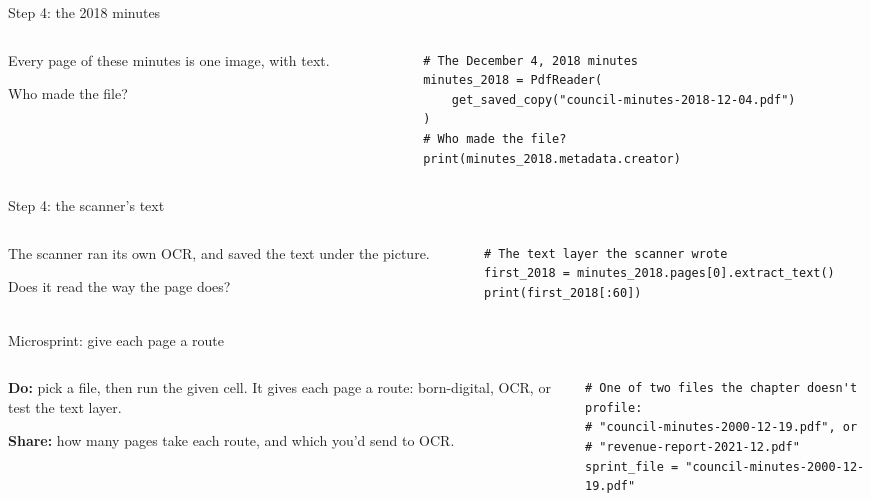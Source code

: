 \documentclass[9pt,aspectratio=169]{beamer}
\begin{document}
\begin{frame}[fragile]{Step 4: the 2018 minutes}
    \begin{columns}[T]
        \begin{column}{0.37\textwidth}
            Every page of these minutes is one image, with text.

            \medskip
            Who made the file?
        \end{column}
        \begin{column}{0.6\textwidth}
\begin{lstlisting}
# The December 4, 2018 minutes
minutes_2018 = PdfReader(
    get_saved_copy("council-minutes-2018-12-04.pdf")
)
# Who made the file?
print(minutes_2018.metadata.creator)
\end{lstlisting}
        \end{column}
    \end{columns}
\end{frame}

\begin{frame}[fragile]{Step 4: the scanner's text}
    \begin{columns}[T]
        \begin{column}{0.37\textwidth}
            The scanner ran its own OCR, and saved the text under the picture.

            \medskip
            Does it read the way the page does?
        \end{column}
        \begin{column}{0.6\textwidth}
\begin{lstlisting}
# The text layer the scanner wrote
first_2018 = minutes_2018.pages[0].extract_text()
print(first_2018[:60])
\end{lstlisting}
        \end{column}
    \end{columns}
\end{frame}

\begin{frame}[fragile]{Microsprint: give each page a route}
    \begin{columns}[T]
        \begin{column}{0.37\textwidth}
            \textbf{Do:} pick a file, then run the given cell. It gives each page a route: born-digital, OCR, or test the text layer.

            \medskip
            \textbf{Share:} how many pages take each route, and which you'd send to OCR.
        \end{column}
        \begin{column}{0.6\textwidth}
\begin{lstlisting}
# One of two files the chapter doesn't profile:
# "council-minutes-2000-12-19.pdf", or
# "revenue-report-2021-12.pdf"
sprint_file = "council-minutes-2000-12-19.pdf"
\end{lstlisting}
        \end{column}
    \end{columns}
\end{frame}
\end{document}
